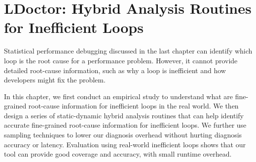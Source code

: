 \chapter[LDoctor: Hybrid Analysis Routines for Inefficient Loops]{LDoctor: Hybrid Analysis Routines for Inefficient Loops}
\label{chap:ldoctor}

Statistical performance debugging discussed in the last chapter can 
identify which loop is the root cause for a performance problem. 
However, it cannot provide detailed root-cause information, 
such as why a loop is inefficient and how developers might fix the problem. 

In this chapter, we first conduct an empirical study to understand what are
fine-grained root-cause information for inefficient loops in the real world. 
We then design a series of static-dynamic hybrid analysis routines that can
help identify accurate fine-grained root-cause information for inefficient loops.
We further use sampling techniques to lower our diagnosis overhead without
hurting diagnosis accuracy or latency. Evaluation using real-world inefficient loops 
shows that our tool can provide good coverage and accuracy, 
with small runtime overhead.







